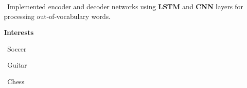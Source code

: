 \documentclass{article}
\begin{document}
\begin{minipage}[t][0pt]{8in\linewidth}
\begin{minipage}[t]{3.1in\linewidth\hspace{2.8em}}
\begin{minipage}[t]{3.3in\textwidth\hspace{0in}}
            \vspace{0.4em}
            \hspace{1em}\textasteriskcentered \, \mdseries\textrm{Implemented encoder and decoder networks using \textbf{LSTM} and \textbf{CNN} layers for processing out-of-vocabulary words.}
        \end{minipage}
    
    \begin{minipage}[t]{3.75in\textwidth\hspace{0in}}
        \vspace{1em}
        \large\mdseries\bfseries{Interests}            
        
        \small\mdseries
        \vspace{0.3em}
        \hspace{0.3em}\textasteriskcentered \, \small\mdseries\textrm{Soccer}

        \vspace{0.3em}
        \hspace{0.3em}\textasteriskcentered \, \small\mdseries\textrm{Guitar}        
        
        \vspace{0.3em}
        \hspace{0.3em}\textasteriskcentered \, \small\mdseries\textrm{Chess}

    \end{minipage}

\end{minipage}


\end{minipage}
\end{document}

